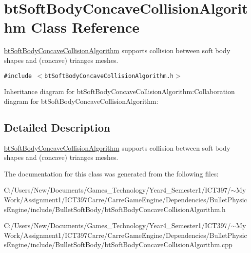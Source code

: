 \hypertarget{classbt_soft_body_concave_collision_algorithm}{
\section{btSoftBodyConcaveCollisionAlgorithm Class Reference}
\label{classbt_soft_body_concave_collision_algorithm}
}
\hyperlink{classbt_soft_body_concave_collision_algorithm}{btSoftBodyConcaveCollisionAlgorithm} supports collision between soft body shapes and (concave) trianges meshes.  


{\tt \#include $<$btSoftBodyConcaveCollisionAlgorithm.h$>$}

Inheritance diagram for btSoftBodyConcaveCollisionAlgorithm:Collaboration diagram for btSoftBodyConcaveCollisionAlgorithm:

\subsection{Detailed Description}
\hyperlink{classbt_soft_body_concave_collision_algorithm}{btSoftBodyConcaveCollisionAlgorithm} supports collision between soft body shapes and (concave) trianges meshes. 

The documentation for this class was generated from the following files:\begin{CompactItemize}
\item 
C:/Users/New/Documents/Games\_\-Technology/Year4\_\-Semester1/ICT397/$\sim$My Work/Assignment1/ICT397Carre/CarreGameEngine/Dependencies/BulletPhysicsEngine/include/BulletSoftBody/btSoftBodyConcaveCollisionAlgorithm.h\item 
C:/Users/New/Documents/Games\_\-Technology/Year4\_\-Semester1/ICT397/$\sim$My Work/Assignment1/ICT397Carre/CarreGameEngine/Dependencies/BulletPhysicsEngine/include/BulletSoftBody/btSoftBodyConcaveCollisionAlgorithm.cpp\end{CompactItemize}
